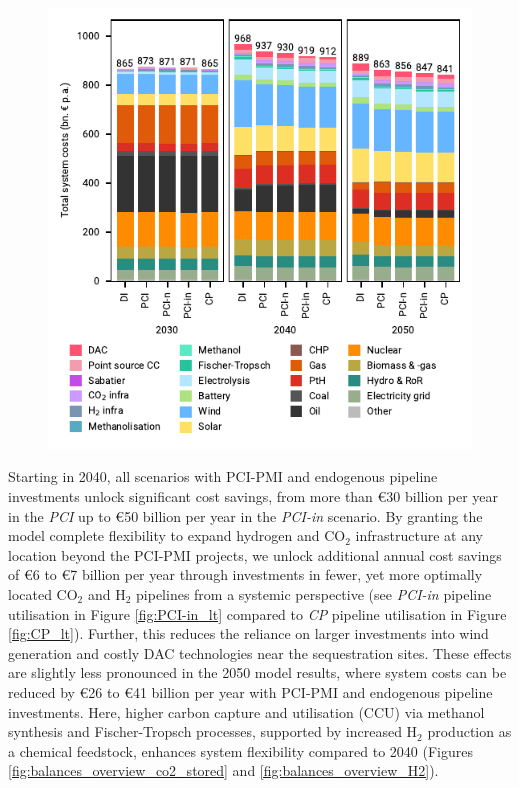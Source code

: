 \documentclass[pdflatex,sn-nature]{sn-jnl}%
\theoremstyle{thmstyleone}%
\theoremstyle{thmstyletwo}%
\theoremstyle{thmstylethree}%
\begin{document}
\begin{figure}[t]
  \centering
  \includegraphics{figures/costs_overview}
  \label{fig:costs_overview}
\end{figure}

Starting in 2040, all scenarios with PCI-PMI and endogenous pipeline investments unlock significant cost savings, from more than €30 billion per year in the \textit{PCI} up to €50 billion per year in the \textit{PCI-in} scenario. 
By granting the model complete flexibility to expand hydrogen and CO$_2$ infrastructure at any location beyond the PCI-PMI projects, we unlock additional annual cost savings of €6 to €7 billion per year through investments in fewer, yet more optimally located CO$_2$ and H$_2$ pipelines from a systemic perspective (see \textit{PCI-in} pipeline utilisation in Figure \ref{fig:PCI-in_lt} compared to \textit{CP} pipeline utilisation in Figure \ref{fig:CP_lt}).
Further, this reduces the reliance on larger investments into wind generation and costly DAC technologies near the sequestration sites. These effects are slightly less pronounced in the 2050 model results, where system costs can be reduced by €26 to €41 billion per year with PCI-PMI and endogenous pipeline investments. Here, higher carbon capture and utilisation (CCU) via methanol synthesis and Fischer-Tropsch processes, supported by increased H$_2$ production as a chemical feedstock, enhances system flexibility compared to 2040 (Figures \ref{fig:balances_overview_co2_stored} and \ref{fig:balances_overview_H2}).
\end{document}
